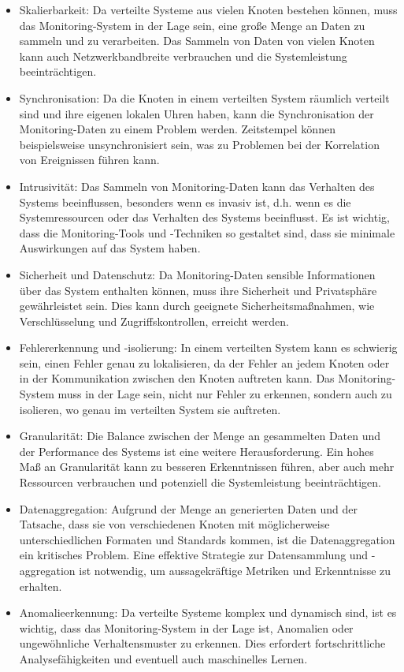 \begin{itemize}
\item Skalierbarkeit: Da verteilte Systeme aus vielen Knoten bestehen können, muss das Monitoring-System in der Lage sein, eine große Menge an Daten zu sammeln und zu verarbeiten. Das Sammeln von Daten von vielen Knoten kann auch Netzwerkbandbreite verbrauchen und die Systemleistung beeinträchtigen.
\item Synchronisation: Da die Knoten in einem verteilten System räumlich verteilt sind und ihre eigenen lokalen Uhren haben, kann die Synchronisation der Monitoring-Daten zu einem Problem werden. Zeitstempel können beispielsweise unsynchronisiert sein, was zu Problemen bei der Korrelation von Ereignissen führen kann.
\item Intrusivität: Das Sammeln von Monitoring-Daten kann das Verhalten des Systems beeinflussen, besonders wenn es invasiv ist, d.h. wenn es die Systemressourcen oder das Verhalten des Systems beeinflusst. Es ist wichtig, dass die Monitoring-Tools und -Techniken so gestaltet sind, dass sie minimale Auswirkungen auf das System haben.
\item Sicherheit und Datenschutz: Da Monitoring-Daten sensible Informationen über das System enthalten können, muss ihre Sicherheit und Privatsphäre gewährleistet sein. Dies kann durch geeignete Sicherheitsmaßnahmen, wie Verschlüsselung und Zugriffskontrollen, erreicht werden.
\item Fehlererkennung und -isolierung: In einem verteilten System kann es schwierig sein, einen Fehler genau zu lokalisieren, da der Fehler an jedem Knoten oder in der Kommunikation zwischen den Knoten auftreten kann. Das Monitoring-System muss in der Lage sein, nicht nur Fehler zu erkennen, sondern auch zu isolieren, wo genau im verteilten System sie auftreten.
\item Granularität: Die Balance zwischen der Menge an gesammelten Daten und der Performance des Systems ist eine weitere Herausforderung. Ein hohes Maß an Granularität kann zu besseren Erkenntnissen führen, aber auch mehr Ressourcen verbrauchen und potenziell die Systemleistung beeinträchtigen.
\item Datenaggregation: Aufgrund der Menge an generierten Daten und der Tatsache, dass sie von verschiedenen Knoten mit möglicherweise unterschiedlichen Formaten und Standards kommen, ist die Datenaggregation ein kritisches Problem. Eine effektive Strategie zur Datensammlung und -aggregation ist notwendig, um aussagekräftige Metriken und Erkenntnisse zu erhalten.
\item Anomalieerkennung: Da verteilte Systeme komplex und dynamisch sind, ist es wichtig, dass das Monitoring-System in der Lage ist, Anomalien oder ungewöhnliche Verhaltensmuster zu erkennen. Dies erfordert fortschrittliche Analysefähigkeiten und eventuell auch maschinelles Lernen.
\end{itemize}
